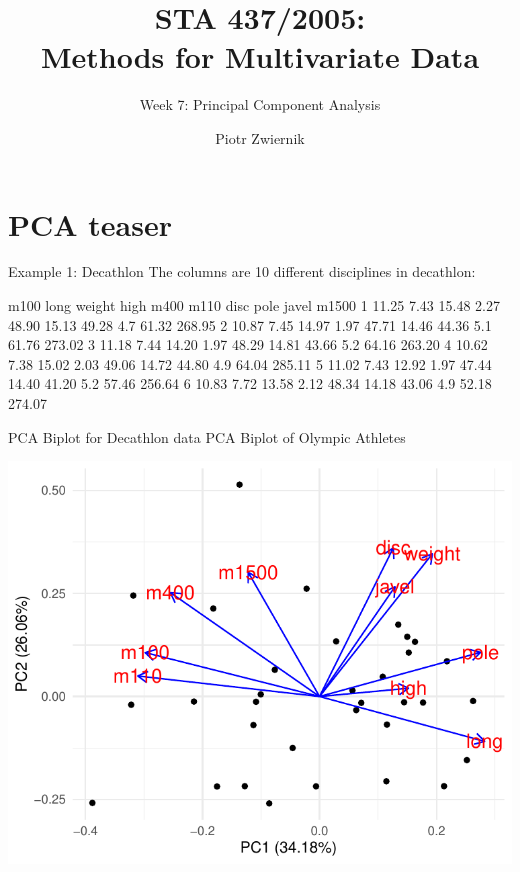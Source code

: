 \documentclass[11pt,handout,aspectratio=169]{beamer}
\title[STA437-Week1]{STA 437/2005: \\ Methods for Multivariate Data}
\subtitle[]{Week 7: Principal Component Analysis}
\author[Prob Learning]{Piotr Zwiernik}
\institute[UofT]{University of Toronto}
\date{}
\begin{document}
\maketitle




\section{PCA teaser}



\begin{frame}[fragile]{Example 1: Decathlon}
The columns are 10 different disciplines in decathlon:
\scriptsize
\begin{Schunk}
\begin{Soutput}
   m100 long weight high  m400  m110  disc pole javel  m1500
1 11.25 7.43  15.48 2.27 48.90 15.13 49.28  4.7 61.32 268.95
2 10.87 7.45  14.97 1.97 47.71 14.46 44.36  5.1 61.76 273.02
3 11.18 7.44  14.20 1.97 48.29 14.81 43.66  5.2 64.16 263.20
4 10.62 7.38  15.02 2.03 49.06 14.72 44.80  4.9 64.04 285.11
5 11.02 7.43  12.92 1.97 47.44 14.40 41.20  5.2 57.46 256.64
6 10.83 7.72  13.58 2.12 48.34 14.18 43.06  4.9 52.18 274.07
\end{Soutput}
\end{Schunk}
\end{frame}


\begin{frame}[fragile]{PCA Biplot for Decathlon data}
PCA Biplot of Olympic Athletes	{\scriptsize
\begin{center}
\includegraphics[width=.6\textwidth]{pics/plot4.1.pdf}		
\end{center}}
\end{frame}
\end{document}
